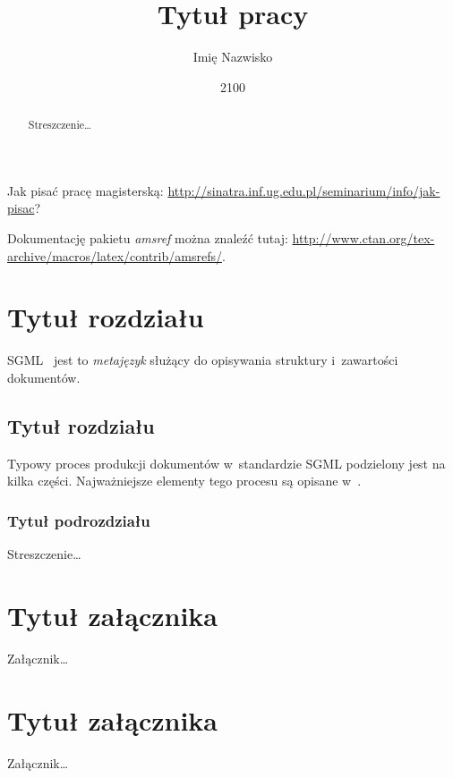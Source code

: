 \documentclass[brudnopis]{xmgr}
\author   {Imię Nazwisko}
\title    {Tytuł pracy}
\date     {2100}
\begin{document}
\begin{abstract}
  Streszczenie…
\end{abstract}

\maketitle

\introduction

Jak pisać pracę magisterską:
\url{http://sinatra.inf.ug.edu.pl/seminarium/info/jak-pisac}?

Dokumentację pakietu \emph{amsref}
można znaleźć tutaj:
\url{http://www.ctan.org/tex-archive/macros/latex/contrib/amsrefs/}.

\chapter{Tytuł rozdziału}

SGML~\cite{Goldfarb2002} jest to \emph{metajęzyk} 
służący do opisywania struktury i~zawartości dokumentów.
    
\section{Tytuł rozdziału}

Typowy proces produkcji dokumentów w~standardzie SGML
podzielony jest na kilka części. Najważniejsze elementy tego
procesu są opisane w~\cite{Eisenberg2002}.

\subsection{Tytuł podrozdziału}

\summary

Streszczenie…

\appendix
\chapter{Tytuł załącznika}

Załącznik…

\chapter{Tytuł załącznika}

Załącznik…

\begin{bibdiv}
\begin{biblist}


\end{biblist}
\end{bibdiv}



\oswiadczenie
\end{document}
